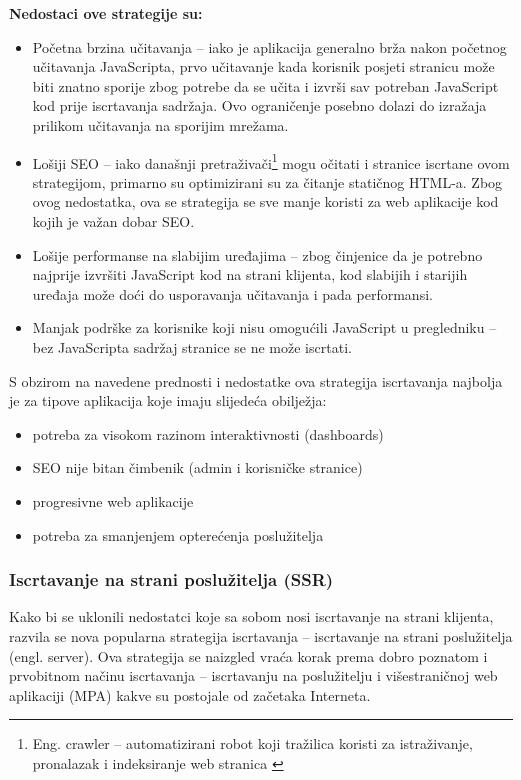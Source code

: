 \bigskip

\textbf{Nedostaci ove strategije su:}

\begin{itemize}
    \item Početna brzina učitavanja – iako je aplikacija generalno brža nakon početnog učitavanja JavaScripta, prvo učitavanje kada korisnik posjeti stranicu može biti znatno sporije zbog potrebe da se učita i izvrši sav potreban JavaScript kod prije iscrtavanja sadržaja. Ovo ograničenje posebno dolazi do izražaja prilikom učitavanja na sporijim mrežama.
    \item Lošiji SEO – iako današnji pretraživači\footnote{Eng. crawler – automatizirani robot koji tražilica koristi za istraživanje, pronalazak i indeksiranje web stranica \cite{googlesearch}} mogu očitati i stranice iscrtane ovom strategijom, primarno su optimizirani su za čitanje statičnog HTML-a. Zbog ovog nedostatka, ova se strategija se sve manje koristi za web aplikacije kod kojih je važan dobar SEO.
    \item Lošije performanse na slabijim uređajima – zbog činjenice da je potrebno najprije izvršiti JavaScript kod na strani klijenta, kod slabijih i starijih uređaja može doći do usporavanja učitavanja i pada performansi.
    \item Manjak podrške za korisnike koji nisu omogućili JavaScript u pregledniku – bez JavaScripta sadržaj stranice se ne može iscrtati.
\end{itemize}

S obzirom na navedene prednosti i nedostatke ova strategija iscrtavanja najbolja je za tipove aplikacija koje imaju slijedeća obilježja:
\begin{itemize}
    \item potreba za visokom razinom interaktivnosti (dashboards)
    \item SEO nije bitan čimbenik (admin i korisničke stranice)
    \item progresivne web aplikacije
    \item potreba za smanjenjem opterećenja poslužitelja
\end{itemize}
\vfill

\subsubsection{Iscrtavanje na strani poslužitelja (SSR)}

Kako bi se uklonili nedostatci koje sa sobom nosi iscrtavanje na strani klijenta, razvila se nova popularna strategija iscrtavanja – iscrtavanje na strani poslužitelja (engl. server). Ova strategija se naizgled vraća korak prema dobro poznatom i prvobitnom načinu iscrtavanja – iscrtavanju na poslužitelju i višestraničnoj web aplikaciji (MPA) kakve su postojale od začetaka Interneta.

